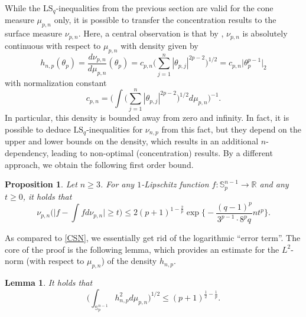 \documentclass[a4paper,12pt]{amsart}
\numberwithin{equation}{section}
\newtheorem{proposition}[satz]{Proposition}
\newtheorem{lemma}[satz]{Lemma}
\theoremstyle{remark}
\def\R{{\mathbb R}}
\def\S{{\mathbb S}}
\begin{document}
While the $\mathrm{LS}_q$-inequalities from the previous section are valid for the cone measure $\mu_{p,n}$ only, it is possible to transfer the concentration results to the surface measure $\nu_{p,n}$. Here, a central observation is that by \cite[Lem.\ 2]{NR03}, $\nu_{p,n}$ is absolutely continuous with respect to $\mu_{p,n}$ with density given by
\begin{equation}\label{eq:dens}
h_{n,p}(\theta_p) = \frac{d\nu_{p,n}}{d\mu_{p,n}} (\theta_p) = c_{p,n} \Big(\sum_{j=1}^n |\theta_{p,j}|^{2p-2} \Big)^{1/2} = c_{p,n} \lvert \theta_p^{p-1} \rvert_2
\end{equation}
with normalization constant
\[
c_{p,n}=\Big(\int \Big(\sum_{j=1}^n |\theta_{p,j}|^{2p-2} \Big)^{1/2} d\mu_{p,n}\Big)^{-1}.
\]
In particular, this density is bounded away from zero and infinity. In fact, it is possible to deduce $\mathrm{LS}_q$-inequalities for $\nu_{n,p}$ from this fact, but they depend on the upper and lower bounds on the density, which results in an additional $n$-dependency, leading to non-optimal (concentration) results. By a different approach, we obtain the following first order bound.

\begin{proposition}\label{LipschUnif}
    Let $n \ge 3$. For any $1$-Lipschitz function $f \colon \S_p^{n-1} \to \R$ and any $t \ge 0$, it holds that
    \[
    \nu_{p,n}\Big(\Big|f - \int f d\nu_{p,n}\Big| \ge t\Big) \le 2 (p+1)^{1-\frac{2}{p}} \exp\Big\{ - \frac{(q-1)^p}{3^{p-1} \cdot 8^p q} n t^p\Big\}.
    \]
\end{proposition}

As compared to \eqref{CSN}, we essentially get rid of the logarithmic ``error term''. The core of the proof is the following lemma, which provides an estimate for the $L^2$-norm (with respect to $\mu_{p,n}$) of the density $h_{n,p}$.

\begin{lemma}\label{L2BdDens}
    It holds that
    \[
    \Big( \int_{\S_p^{n-1}} h_{n,p}^2 d\mu_{p,n} \Big)^{1/2} \le (p+1)^{\frac{1}{2} - \frac{1}{p}}.
    \]
\end{lemma}
\end{document}
